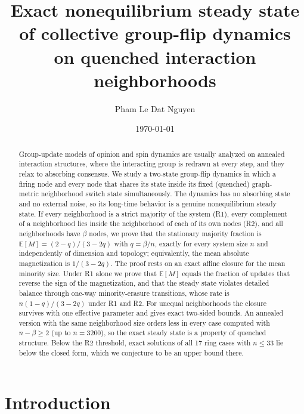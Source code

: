 \documentclass[aps,pre,reprint,superscriptaddress,amsmath,amssymb,longbibliography]{revtex4-2}
\theoremstyle{remark}
\newcommand{\E}{\mathbb{E}}
\begin{document}
\title{Exact nonequilibrium steady state of collective group-flip dynamics\\
on quenched interaction neighborhoods}

\author{Pham Le Dat Nguyen}

\date{\today}

\begin{abstract}
Group-update models of opinion and spin dynamics are usually analyzed on
annealed interaction structures, where the interacting group is redrawn
at every step, and they relax to absorbing consensus. We study a
two-state group-flip dynamics in which a firing node and every node that
shares its state inside its fixed (quenched) graph-metric neighborhood
switch state simultaneously. The dynamics has no absorbing state and no
external noise, so its long-time behavior is a genuine nonequilibrium
steady state. If every neighborhood is a strict majority of the system
(R1), every complement of a neighborhood lies inside the neighborhood of
each of its own nodes (R2), and all neighborhoods have $\beta$ nodes, we
prove that the stationary majority fraction is
$\E[M]=(2-q)/(3-2q)$ with $q=\beta/n$, exactly for every system size $n$
and independently of dimension and topology; equivalently, the mean
absolute magnetization is $1/(3-2q)$. The proof rests on an exact affine
closure for the mean minority size. Under R1 alone we prove that
$\E[M]$ equals the fraction of updates that reverse the sign of the
magnetization, and that the steady state violates detailed balance
through one-way minority-erasure transitions, whose rate is
$n(1-q)/(3-2q)$ under R1 and R2. For unequal neighborhoods the closure
survives with one effective parameter and gives exact two-sided bounds.
An annealed version with the same neighborhood size orders less in every
case computed with $n-\beta\ge2$ (up to $n=3200$), so the exact steady
state is a property of quenched structure. Below the R2 threshold, exact solutions of all 17
ring cases with $n\le33$ lie below the closed form, which we conjecture
to be an upper bound there.
\end{abstract}

\maketitle

\section{Introduction}
\label{sec:intro}
\end{document}
